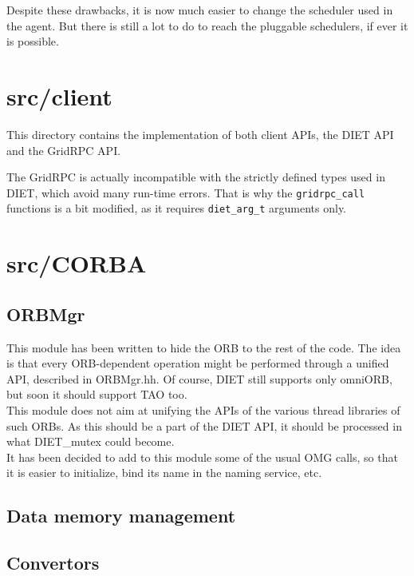 Despite these drawbacks, it is now much easier to change the scheduler used in
the agent. But there is still a lot to do to reach the pluggable schedulers, if
ever it is possible.

\section{\textsf{src/client}}
\label{s:client}

This directory contains the implementation of both client APIs, the DIET API and
the GridRPC API.

The GridRPC is actually incompatible with the strictly defined types used in
DIET, which avoid many run-time errors. That is why the \texttt{gridrpc\_call}
functions is a bit modified, as it requires \texttt{diet\_arg\_t} arguments
only.



\section{\textsf{src/CORBA}}
\label{s:CORBA}

\subsection{\textsf{ORBMgr}}

This module has been written to hide the ORB to the rest of the code. The idea
is that every ORB-dependent operation might be performed through a unified API,
described in \textsf{ORBMgr.hh}. Of course, DIET still supports only omniORB,
but soon it should support TAO too.
\\
This module does not aim at unifying the APIs of the various thread libraries of
such ORBs. As this should be a part of the DIET API, it should be processed in
what \textsf{DIET\_mutex} could become.
\\
It has been decided to add to this module some of the usual OMG calls, so that
it is easier to initialize, bind its name in the naming service, etc.


\subsection{Data memory management}



\subsection{Convertors}

